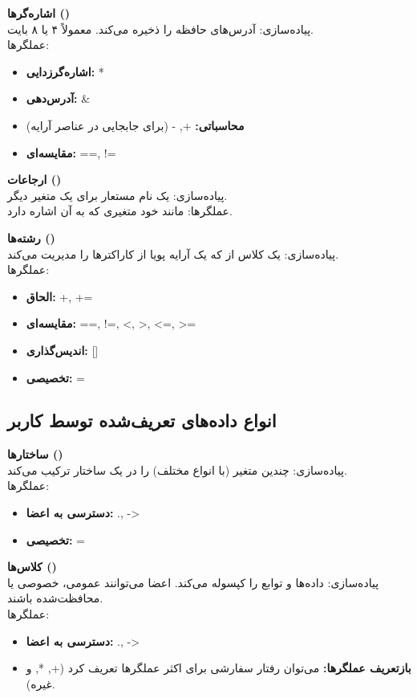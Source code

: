 \documentclass[12pt, a4paper]{report}
\begin{document}
\textbf{اشاره‌گرها ()} \\
پیاده‌سازی: آدرس‌های حافظه را ذخیره می‌کند. معمولاً ۴ یا ۸ بایت. \\
عملگرها:
\begin{itemize}
	\item \textbf{اشاره‌گرزدایی:} *
	\item \textbf{آدرس‌دهی:} \&
	\item \textbf{محاسباتی:} +, - (برای جابجایی در عناصر آرایه)
	\item \textbf{مقایسه‌ای:} ==, !=
\end{itemize}

\textbf{ارجاعات ()} \\
پیاده‌سازی: یک نام مستعار برای یک متغیر دیگر. \\
عملگرها: مانند خود متغیری که به آن اشاره دارد.

\textbf{رشته‌ها ()} \\
پیاده‌سازی: یک کلاس از  که یک آرایه پویا از کاراکترها را مدیریت می‌کند. \\
عملگرها:
\begin{itemize}
	\item \textbf{الحاق:} +, +=
	\item \textbf{مقایسه‌ای:} ==, !=, <, >, <=, >=
	\item \textbf{اندیس‌گذاری:} []
	\item \textbf{تخصیصی:} =
\end{itemize}

\subsection{انواع داده‌های تعریف‌شده توسط کاربر}

\textbf{ساختارها ()} \\
پیاده‌سازی: چندین متغیر (با انواع مختلف) را در یک ساختار ترکیب می‌کند. \\
عملگرها:
\begin{itemize}
	\item \textbf{دسترسی به اعضا:} ., ->
	\item \textbf{تخصیصی:} =
\end{itemize}

\textbf{کلاس‌ها ()} \\
پیاده‌سازی: داده‌ها و توابع را کپسوله می‌کند. اعضا می‌توانند عمومی، خصوصی یا محافظت‌شده باشند. \\
عملگرها:
\begin{itemize}
	\item \textbf{دسترسی به اعضا:} ., ->
	\item \textbf{بازتعریف عملگرها:} می‌توان رفتار سفارشی برای اکثر عملگرها تعریف کرد (+, *, و غیره).
\end{itemize}
\end{document}
